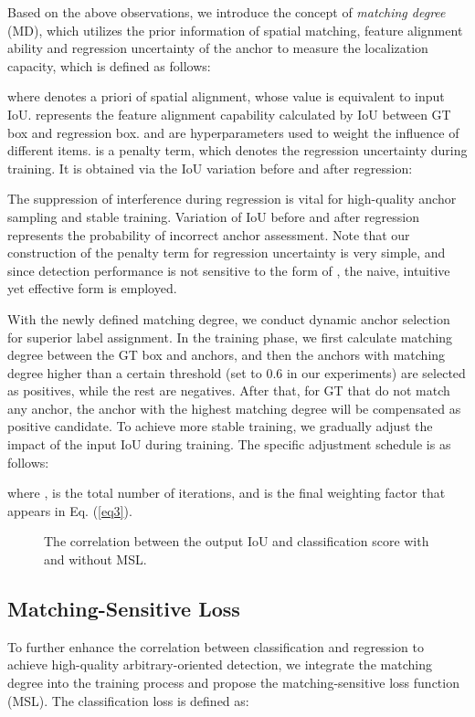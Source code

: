 \documentclass[letterpaper]{article} \usepackage{aaai21}  \usepackage{times}  \usepackage{helvet} \usepackage{courier}  \usepackage[hyphens]{url}  \usepackage{graphicx} \urlstyle{rm} \def\UrlFont{\rm}  \usepackage{natbib}  \usepackage{caption} \frenchspacing  \setlength{\pdfpagewidth}{8.5in}  \setlength{\pdfpageheight}{11in}  \usepackage{url}
\begin{document}
Based on the above observations, we introduce the concept of \textit{matching degree} (MD), which  utilizes the prior information of spatial matching, feature alignment ability and regression uncertainty of the anchor to measure the localization capacity, which is defined as follows: 

where  denotes a priori of spatial alignment, whose value is equivalent to input IoU.  represents the feature alignment capability calculated by IoU between GT box and regression box.  and  are hyperparameters used to weight the influence of different items.  is a penalty term, which denotes the regression uncertainty during training. It is obtained via the IoU variation before and after regression:


The suppression of interference  during regression is vital for high-quality anchor sampling and stable training. Variation of IoU before and after regression represents the probability of incorrect anchor assessment. Note that our construction of the penalty term for regression uncertainty is very simple, and since detection performance is not sensitive to the form of  , the naive, intuitive yet effective form is employed.

With the newly defined matching degree, we  conduct dynamic anchor selection for superior label assignment. In the training phase, we first calculate matching degree between the GT box and anchors, and then the anchors with matching degree higher than a certain threshold (set to 0.6 in our experiments) are selected as positives, while the rest are negatives. After that, for GT that do not match any anchor, the anchor with the highest matching degree will be compensated as positive candidate. To achieve more stable training,  we gradually adjust the impact of the input IoU during training. The specific adjustment schedule is as follows:
 
where ,  is the total number of iterations, and  is the final weighting factor that appears in Eq. (\ref{eq3}).

\begin{figure}[t]
	\hspace{-1mm}
	\caption{ The correlation between the output IoU and classification score with and without MSL.}
	\label{fig3}
\end{figure}

\subsection{Matching-Sensitive Loss }
To further enhance the correlation between classification and regression to achieve high-quality arbitrary-oriented detection, we integrate the matching degree into the training process and propose the matching-sensitive loss function (MSL). The classification loss is defined as:
\end{document}
